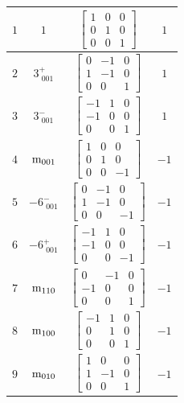 \documentclass[fleqn,8pt]{jsarticle}
\begin{document}
\begin{longtable}{cccc}
$ 1 $ & $ 1 $ & $ \begin{bmatrix} 1 & 0 & 0 \\ 0 & 1 & 0 \\ 0 & 0 & 1 \end{bmatrix} $ & $ 1 $ \\ \hline
$ 2 $ & $ 3^{+}_{\,\,001} $ & $ \begin{bmatrix} 0 & -1 & 0 \\ 1 & -1 & 0 \\ 0 & 0 & 1 \end{bmatrix} $ & $ 1 $ \\ \hline
$ 3 $ & $ 3^{-}_{\,\,001} $ & $ \begin{bmatrix} -1 & 1 & 0 \\ -1 & 0 & 0 \\ 0 & 0 & 1 \end{bmatrix} $ & $ 1 $ \\ \hline
$ 4 $ & $ {\rm m}_{001} $ & $ \begin{bmatrix} 1 & 0 & 0 \\ 0 & 1 & 0 \\ 0 & 0 & -1 \end{bmatrix} $ & $ -1 $ \\ \hline
$ 5 $ & $ -6^{-}_{\,\,001} $ & $ \begin{bmatrix} 0 & -1 & 0 \\ 1 & -1 & 0 \\ 0 & 0 & -1 \end{bmatrix} $ & $ -1 $ \\ \hline
$ 6 $ & $ -6^{+}_{\,\,001} $ & $ \begin{bmatrix} -1 & 1 & 0 \\ -1 & 0 & 0 \\ 0 & 0 & -1 \end{bmatrix} $ & $ -1 $ \\ \hline
$ 7 $ & $ {\rm m}_{110} $ & $ \begin{bmatrix} 0 & -1 & 0 \\ -1 & 0 & 0 \\ 0 & 0 & 1 \end{bmatrix} $ & $ -1 $ \\ \hline
$ 8 $ & $ {\rm m}_{100} $ & $ \begin{bmatrix} -1 & 1 & 0 \\ 0 & 1 & 0 \\ 0 & 0 & 1 \end{bmatrix} $ & $ -1 $ \\ \hline
$ 9 $ & $ {\rm m}_{010} $ & $ \begin{bmatrix} 1 & 0 & 0 \\ 1 & -1 & 0 \\ 0 & 0 & 1 \end{bmatrix} $ & $ -1 $ \\ \hline

\end{longtable}
\end{document}
